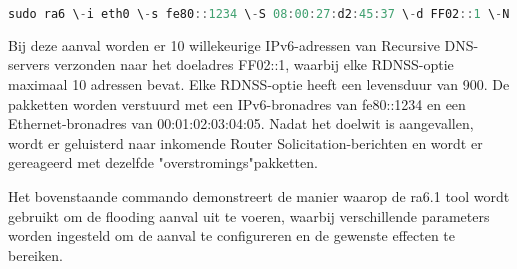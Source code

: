 \begin{lstlisting}[language=PowerShell,style=PowerShellStyle]
    sudo ra6 \-i eth0 \-s fe80::1234 \-S 08:00:27:d2:45:37 \-d FF02::1 \-N 900 \-\-flood\-dns 10#10 \-L
\end{lstlisting}

Bij deze aanval worden er 10 willekeurige IPv6-adressen van Recursive DNS-servers verzonden naar het doeladres FF02::1, waarbij elke RDNSS-optie maximaal 10 adressen bevat. Elke RDNSS-optie heeft een levensduur van 900. De pakketten worden verstuurd met een IPv6-bronadres van fe80::1234 en een Ethernet-bronadres van 00:01:02:03:04:05. Nadat het doelwit is aangevallen, wordt er geluisterd naar inkomende Router Solicitation-berichten en wordt er gereageerd met dezelfde "overstromings"pakketten.

Het bovenstaande commando demonstreert de manier waarop de ra6.1 tool wordt gebruikt om de flooding aanval uit te voeren, waarbij verschillende parameters worden ingesteld om de aanval te configureren en de gewenste effecten te bereiken.